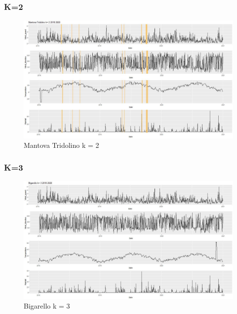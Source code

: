 \documentclass{article}
\begin{document}
\subsubsection{K=2}
\begin{figure}[H]
  \centering 
  \includegraphics[scale = 0.3]{Picture/2/Mantova Tridolino k= 2 2018 2020 .jpeg}
  \caption{Mantova Tridolino k = 2}
  \centering
\end{figure}
\subsubsection{K=3}
\begin{figure}[H]
  \centering 
  \includegraphics[scale = 0.3]{Picture/3/Bigarello k= 3 2018 2020 .jpeg}
  \caption{Bigarello k = 3}
  \centering
\end{figure}
\end{document}
